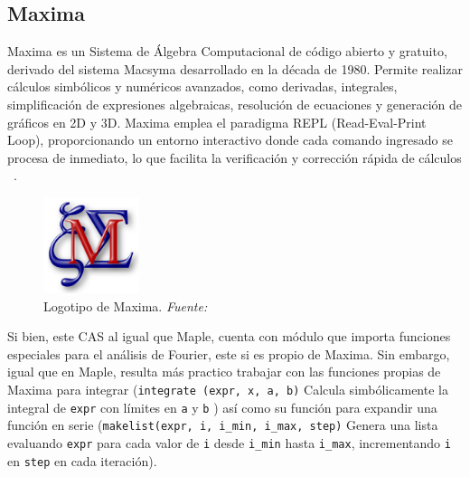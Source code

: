 \subsection{Maxima}
Maxima es un Sistema de Álgebra Computacional de código abierto y gratuito, derivado del sistema Macsyma desarrollado en la década de 1980. Permite realizar cálculos simbólicos y numéricos avanzados, como derivadas, integrales, simplificación de expresiones algebraicas, resolución de ecuaciones y generación de gráficos en 2D y 3D. Maxima emplea el paradigma REPL (Read-Eval-Print Loop), proporcionando un entorno interactivo donde cada comando ingresado se procesa de inmediato, lo que facilita la verificación y corrección rápida de cálculos ~\cite{MaximaSourgeforce}. 
\begin{figure}[H]
	\centering
	\includegraphics[width=0.25\textwidth]{img/chapter02/logo_maxima.png}
	\caption[Logotipo de Maxima.]{Logotipo de Maxima. \textit{Fuente: ~\cite{MaximaSourgeforce}}}
	\label{fig:logo-maxima}  %
\end{figure}
Si bien, este CAS al igual que Maple, cuenta con módulo que importa funciones especiales para el análisis de Fourier, este si es propio de Maxima. Sin embargo, igual que en Maple, resulta más practico trabajar con las funciones propias de Maxima para integrar (\texttt{integrate (expr, x, a, b)} Calcula simbólicamente la integral de \texttt{expr} con límites en \texttt{a} y \texttt{b} ) así como su función para expandir una función en serie (\texttt{makelist(expr, i, i\_min, i\_max, step)} Genera una lista evaluando \texttt{expr} para cada valor de \texttt{i} desde \texttt{i\_min} hasta \texttt{i\_max}, incrementando \texttt{i} en \texttt{step} en cada iteración). 

